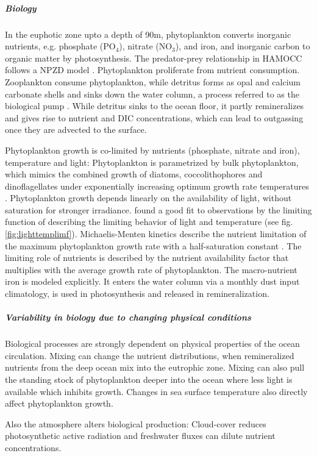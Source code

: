 \documentclass[12pt]{article}
\begin{document}
\subparagraph{Biology}
In the euphotic zone upto a depth of 90m, phytoplankton converts inorganic nutrients, e.g. phosphate (PO$_4$), nitrate (NO$_3$), and iron, and inorganic carbon to organic matter by photosynthesis. The predator-prey relationship in HAMOCC follows a NPZD model \citep{Six1996}. Phytoplankton proliferate from nutrient consumption.  Zooplankton consume phytoplankton, while detritus forms as opal and calcium carbonate shells and sinks down the water column, a process referred to as the biological pump \citep{VolkHoffert1985}. While detritus sinks to the ocean floor, it partly remineralizes and gives rise to nutrient and DIC concentrations, which can lead to outgassing once they are advected to the surface. 

Phytoplankton growth is co-limited by nutrients (phosphate, nitrate and iron), temperature and light: Phytoplankton is parametrized by bulk phytoplankton, which mimics the combined growth of diatoms, coccolithophores and dinoflagellates under exponentially increasing optimum growth rate temperatures \citep{Eppley1972}. 
Phytoplankton growth depends linearly on the availability of light, without saturation for stronger irradiance. \cite{PlattJassby1976} found a good fit to observations by the limiting function of \cite{Smith1936} describing the limiting behavior of light and temperature \citep{Six1996} (see fig. \ref{fig:lighttemplimf}). 
Michaelis-Menten kinetics describe the nutrient limitation of the maximum phytoplankton growth rate with a half-saturation constant \citep{MichaelisMenten1913}. The limiting role of nutrients is described by the nutrient availability factor that multiplies with the average growth rate of phytoplankton. 
The macro-nutrient iron is modeled explicitly. It enters the water column via a monthly dust input climatology, is used in photosynthesis and released in remineralization. 



\subparagraph{Variability in biology due to changing physical conditions}
Biological processes are strongly dependent on physical properties of the ocean circulation. Mixing can change the nutrient distributions, when remineralized nutrients from the deep ocean mix into the eutrophic zone. Mixing can also pull the standing stock of phytoplankton deeper into the ocean where less light is available which inhibits growth. Changes in sea surface temperature also directly affect phytoplankton growth. 

Also the atmosphere alters biological production: Cloud-cover reduces photosynthetic active radiation and freshwater fluxes can dilute nutrient concentrations. 
\end{document}

